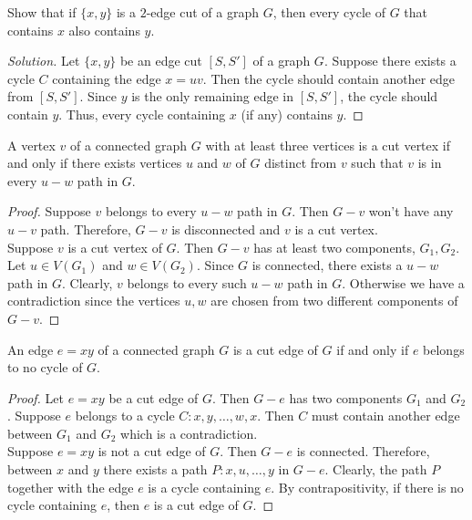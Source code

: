 \begin{exercise}
	Show that if $\{x,y\}$ is a $2$-edge cut of a graph $G$, then every cycle of $G$ that contains $x$ also contains $y$.
\end{exercise}
\begin{proof}[Solution]
	Let $\{x,y\}$ be an edge cut $[S,S']$ of a graph $G$. Suppose there exists a cycle $C$ containing the edge $x = uv$. Then the cycle should contain another edge from $[S,S']$. Since $y$ is the only remaining edge in $[S,S']$, the cycle should contain $y$. Thus, every cycle containing $x$ (if any) contains $y$.
\end{proof}

\begin{theorem}
	A vertex $v$ of a connected graph $G$ with at least three vertices is a cut vertex if and only if there exists vertices $u$ and $w$ of $G$ distinct from $v$ such that $v$ is in every $u-w$ path in $G$.
\end{theorem}
\begin{proof}
	Suppose $v$ belongs to every $u-w$ path in $G$. Then $G-v$ won't have any $u-v$ path. Therefore, $G-v$ is disconnected and $v$ is a cut vertex.\\

	Suppose $v$ is a cut vertex of $G$. Then $G-v$ has at least two components, $G_1,G_2$. Let $u \in V(G_1)$ and $w \in V(G_2)$. Since $G$ is connected, there exists a $u-w$ path in $G$. Clearly, $v$ belongs to every such $u-w$ path in $G$. Otherwise we have a contradiction since the vertices $u,w$ are chosen from two different components of $G-v$.
\end{proof}

\begin{theorem}
	An edge $e = xy$ of a connected graph $G$ is a cut edge of $G$ if and only if $e$ belongs to no cycle of $G$.
\end{theorem}
\begin{proof}
	Let $e = xy$ be a cut edge of $G$. Then $G-e$ has two components $G_1$ and $G_2$. Suppose $e$ belongs to a cycle $C : x,y,\dots,w,x$. Then $C$ must contain another edge between $G_1$ and $G_2$ which is a contradiction.\\

	Suppose $e = xy$ is not a cut edge of $G$. Then $G-e$ is connected. Therefore, between $x$ and $y$ there exists a path $P : x,u,\dots,y$ in $G-e$. Clearly, the path $P$ together with the edge $e$ is a cycle containing $e$. By contrapositivity, if there is no cycle containing $e$, then $e$ is a cut edge of $G$.
\end{proof}

